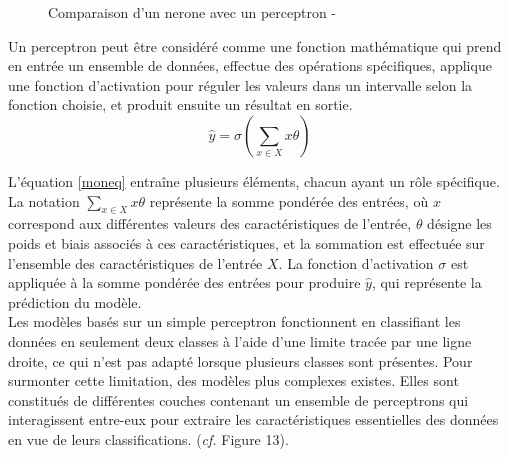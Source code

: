 \begin{figure}[H]
            \centering
            \caption{Comparaison d'un nerone avec un perceptron  -  \cite{datacamp}} 
        \end{figure}

\noindent Un perceptron peut être considéré comme une fonction mathématique qui prend en entrée un ensemble de données, effectue des opérations spécifiques, applique une fonction d'activation pour réguler les valeurs dans un intervalle selon la fonction choisie, et produit ensuite un résultat en sortie. \\

\begin{equation}
\hat{y} = \sigma(\sum_{x \in X } x \theta )
\label{moneq}
\end{equation} 
\vspace{1cm}

\noindent L'équation \eqref{moneq} entraîne plusieurs éléments, chacun ayant un rôle spécifique. La notation $\sum_{x \in X} x \theta$ représente la somme pondérée des entrées, où $x$ correspond aux différentes valeurs des caractéristiques de l'entrée, $\theta$ désigne les poids et biais associés à ces caractéristiques, et la sommation est effectuée sur l'ensemble des caractéristiques de l'entrée $X$. La fonction d'activation $\sigma$ est appliquée à la somme pondérée des entrées pour produire $\hat{y}$, qui représente la prédiction du modèle. \\

\noindent Les modèles basés sur un simple perceptron fonctionnent en classifiant les données en seulement deux classes à l'aide d'une limite tracée par une ligne droite, ce qui n'est pas adapté lorsque plusieurs classes sont présentes. Pour surmonter cette limitation, des modèles plus complexes existes. Elles sont constitués de différentes couches contenant un ensemble de perceptrons qui interagissent entre-eux pour extraire les caractéristiques essentielles des données en vue de leurs classifications. (\textit{cf.} Figure 13).\\


